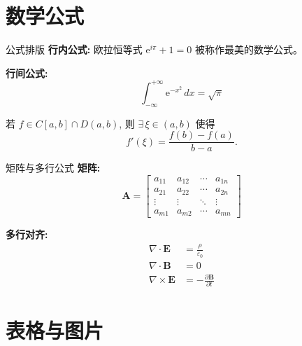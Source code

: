 \documentclass[aspectratio=169, 10pt, UTF8]{ctexbeamer}
\begin{document}
\section{数学公式}

\begin{frame}{公式排版}
  \textbf{行内公式:}
  欧拉恒等式 $\mathrm{e}^{i\pi} + 1 = 0$ 被称作最美的数学公式。

  \vspace{0.4em}
  \textbf{行间公式:}
  \begin{equation}
    \int_{-\infty}^{+\infty} \mathrm{e}^{-x^{2}} \, dx = \sqrt{\pi}
  \end{equation}

  \begin{theorem}[拉格朗日中值定理]
    若 $f \in C[a,b] \cap D(a,b)$, 则 $\exists\,\xi \in (a,b)$ 使得
    \begin{equation*}
      f'(\xi) = \frac{f(b) - f(a)}{b - a}.
    \end{equation*}
  \end{theorem}
\end{frame}

\begin{frame}{矩阵与多行公式}
  \textbf{矩阵:}
  \begin{equation}
    \mathbf{A} =
    \begin{bmatrix}
      a_{11} & a_{12} & \cdots & a_{1n} \\
      a_{21} & a_{22} & \cdots & a_{2n} \\
      \vdots & \vdots & \ddots & \vdots \\
      a_{m1} & a_{m2} & \cdots & a_{mn}
    \end{bmatrix}
  \end{equation}

  \textbf{多行对齐:}
  \begin{align}
    \nabla \cdot \mathbf{E}   &= \frac{\rho}{\varepsilon_0} \\
    \nabla \cdot \mathbf{B}   &= 0 \\
    \nabla \times \mathbf{E}  &= -\frac{\partial \mathbf{B}}{\partial t}
  \end{align}
\end{frame}

\section{表格与图片}
\end{document}
